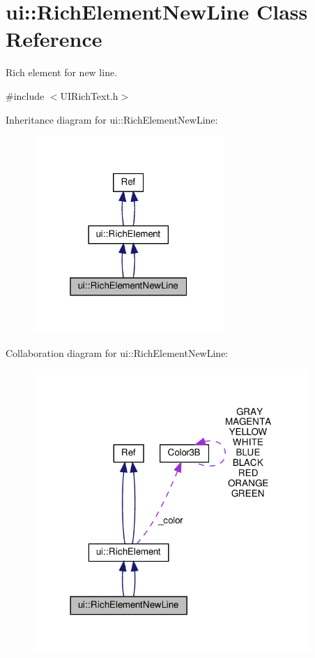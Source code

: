 \hypertarget{classui_1_1RichElementNewLine}{}\section{ui\+:\+:Rich\+Element\+New\+Line Class Reference}
\label{classui_1_1RichElementNewLine}


Rich element for new line.  




{\ttfamily \#include $<$U\+I\+Rich\+Text.\+h$>$}



Inheritance diagram for ui\+:\+:Rich\+Element\+New\+Line\+:
\nopagebreak
\begin{figure}[H]
\begin{center}
\leavevmode
\includegraphics[width=205pt]{classui_1_1RichElementNewLine__inherit__graph}
\end{center}
\end{figure}


Collaboration diagram for ui\+:\+:Rich\+Element\+New\+Line\+:
\nopagebreak
\begin{figure}[H]
\begin{center}
\leavevmode
\includegraphics[width=297pt]{classui_1_1RichElementNewLine__coll__graph}
\end{center}
\end{figure}
